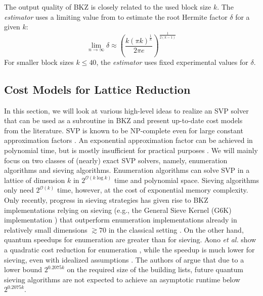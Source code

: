 The output quality of BKZ is closely related to the used block size $k$. The \textit{estimator} uses a limiting value from \cite{Chen13} to estimate the root Hermite factor $\delta$ for a given $k$:
\begin{equation}
  \lim_{n\rightarrow \infty} \delta \approx \left( \frac{k (\pi k)^{\frac{1}{k}}}{2\pi e}\right)^{\frac{1}{2(k-1)}}
\end{equation}
For smaller block sizes $k\leq 40$, the \textit{estimator} uses fixed experimental values for $\delta$.





\subsection{Cost Models for Lattice Reduction} \label{sec:costmodels}
In this section, we will look at various high-level ideas to realize an SVP solver that can be used as a subroutine in BKZ and present up-to-date cost models from the literature. SVP is known to be NP-complete even for large constant approximation factors \cite{Ajt98, Khot05}. An exponential approximation factor can be achieved in polynomial time, but is mostly insufficient for practical purposes \cite{LLL82}.  We will mainly focus on two classes of (nearly) exact SVP solvers, namely, enumeration algorithms and sieving algorithms. Enumeration algorithms can solve SVP in a lattice of dimension $k$ in $2^{\mathcal{O}(k \log k)}$ time and polynomial space. Sieving algorithms only need $2^{\mathcal{O}(k)}$ time, however, at the cost of exponential memory complexity. Only recently, progress in sieving strategies has given rise to BKZ implementations relying on sieving (e.g., the General Sieve Kernel (G6K) implementation \cite{ADHKPS19, DSW21}) that outperform enumeration implementations already in relatively small dimensions $\gtrsim 70$ in the classical setting \cite{ABLR21}. On the other hand, quantum speedups for enumeration are greater than for sieving. Aono \textit{et al.} show a quadratic cost reduction for enumeration \cite{ANS18}, while the speedup is much lower for sieving, even with idealized assumptions \cite{Laa15}. The authors of \cite{ADPS16} argue that due to a lower bound $2^{0.2075k}$ on the required size of the building lists, future quantum sieving algorithms are not expected to achieve an asymptotic runtime below $2^{0.2075k}$. %

